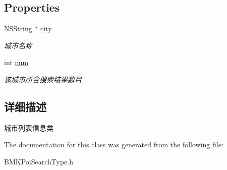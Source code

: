 \subsection*{Properties}
\begin{DoxyCompactItemize}
\item 
\hypertarget{interface_b_m_k_city_list_info_ad1b2093344ad0524a9bef93c823f8242}{N\-S\-String $\ast$ \hyperlink{interface_b_m_k_city_list_info_ad1b2093344ad0524a9bef93c823f8242}{city}}\label{interface_b_m_k_city_list_info_ad1b2093344ad0524a9bef93c823f8242}

\begin{DoxyCompactList}\small\item\em 城市名称 \end{DoxyCompactList}\item 
\hypertarget{interface_b_m_k_city_list_info_a63163c524339e1687d90541b3a24b54c}{int \hyperlink{interface_b_m_k_city_list_info_a63163c524339e1687d90541b3a24b54c}{num}}\label{interface_b_m_k_city_list_info_a63163c524339e1687d90541b3a24b54c}

\begin{DoxyCompactList}\small\item\em 该城市所含搜索结果数目 \end{DoxyCompactList}\end{DoxyCompactItemize}


\subsection{详细描述}
城市列表信息类 

The documentation for this class was generated from the following file\-:\begin{DoxyCompactItemize}
\item 
B\-M\-K\-Poi\-Search\-Type.\-h\end{DoxyCompactItemize}
